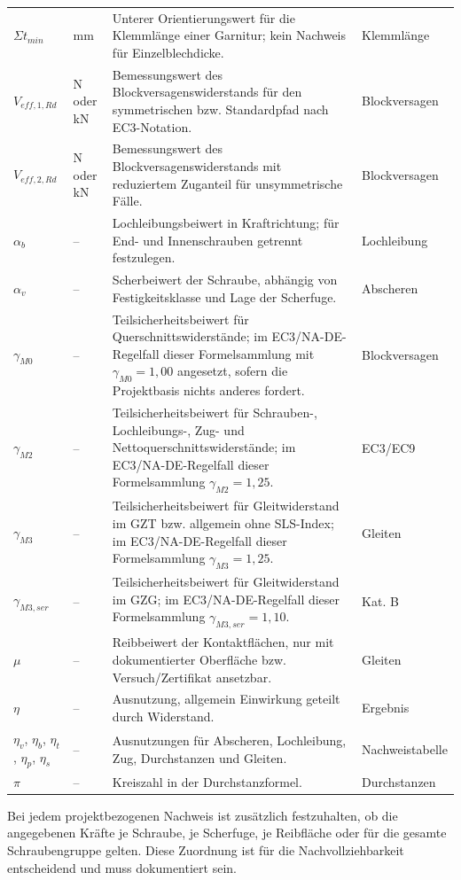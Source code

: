 \documentclass[10pt,a4paper]{article}
\begin{document}
\begin{longtable}{@{}p{25mm}p{24mm}p{82mm}p{24mm}@{}}
$\Sigma t_{min}$ & mm & Unterer Orientierungswert für die Klemmlänge einer Garnitur; kein Nachweis für Einzelblechdicke. & Klemmlänge \\
$V_{eff,1,Rd}$ & N oder kN & Bemessungswert des Blockversagenswiderstands für den symmetrischen bzw. Standardpfad nach EC3-Notation. & Blockversagen \\
$V_{eff,2,Rd}$ & N oder kN & Bemessungswert des Blockversagenswiderstands mit reduziertem Zuganteil für unsymmetrische Fälle. & Blockversagen \\
$\alpha_b$ & -- & Lochleibungsbeiwert in Kraftrichtung; für End- und Innenschrauben getrennt festzulegen. & Lochleibung \\
$\alpha_v$ & -- & Scherbeiwert der Schraube, abhängig von Festigkeitsklasse und Lage der Scherfuge. & Abscheren \\
$\gamma_{M0}$ & -- & Teilsicherheitsbeiwert für Querschnittswiderstände; im EC3/NA-DE-Regelfall dieser Formelsammlung mit $\gamma_{M0}=1{,}00$ angesetzt, sofern die Projektbasis nichts anderes fordert. & Blockversagen \\
$\gamma_{M2}$ & -- & Teilsicherheitsbeiwert für Schrauben-, Lochleibungs-, Zug- und Nettoquerschnittswiderstände; im EC3/NA-DE-Regelfall dieser Formelsammlung $\gamma_{M2}=1{,}25$. & EC3/EC9 \\
$\gamma_{M3}$ & -- & Teilsicherheitsbeiwert für Gleitwiderstand im GZT bzw. allgemein ohne SLS-Index; im EC3/NA-DE-Regelfall dieser Formelsammlung $\gamma_{M3}=1{,}25$. & Gleiten \\
$\gamma_{M3,ser}$ & -- & Teilsicherheitsbeiwert für Gleitwiderstand im GZG; im EC3/NA-DE-Regelfall dieser Formelsammlung $\gamma_{M3,ser}=1{,}10$. & Kat. B \\
$\mu$ & -- & Reibbeiwert der Kontaktflächen, nur mit dokumentierter Oberfläche bzw. Versuch/Zertifikat ansetzbar. & Gleiten \\
$\eta$ & -- & Ausnutzung, allgemein Einwirkung geteilt durch Widerstand. & Ergebnis \\
$\eta_v$, $\eta_b$, $\eta_t$, $\eta_p$, $\eta_s$ & -- & Ausnutzungen für Abscheren, Lochleibung, Zug, Durchstanzen und Gleiten. & Nachweistabelle \\
$\pi$ & -- & Kreiszahl in der Durchstanzformel. & Durchstanzen \\
\bottomrule
\end{longtable}

\begin{hinweisbox}
Bei jedem projektbezogenen Nachweis ist zusätzlich festzuhalten, ob die angegebenen Kräfte je Schraube, je Scherfuge, je Reibfläche oder für die gesamte Schraubengruppe gelten. Diese Zuordnung ist für die Nachvollziehbarkeit entscheidend und muss dokumentiert sein.
\end{hinweisbox}
\end{document}
